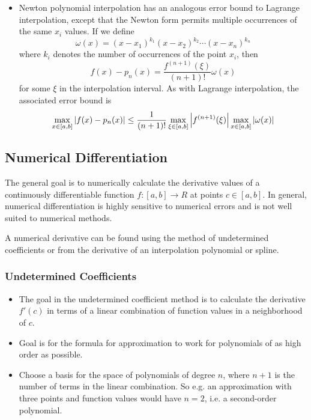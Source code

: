 \documentclass[11pt, a4paper]{article}
\begin{document}
\begin{itemize}
	\item Newton polynomial interpolation has an analogous error bound to Lagrange interpolation, except that the Newton form permits multiple occurrences of the same $ x_{i} $ values. If we define
	\begin{equation*}
		 \omega(x) = (x-x_{1})^{k_{1}}(x-x_{2})^{k_{2}}\cdots(x-x_{n})^{k_{n}}
	\end{equation*}
	where $ k_{i} $ denotes the number of occurrences of the point $ x_{i} $, then
	\begin{equation*}
		f(x) - p_{n}(x) = \frac{f^{(n+1)}(\xi)}{(n+1)!}\omega(x)
	\end{equation*}
	for some $ \xi $ in the interpolation interval. As with Lagrange interpolation, the associated error bound is
	\begin{equation*}
	 	\max_{x\in [a,b]} \abs{f(x) - p_{n}(x)} \leq \frac{1}{(n+1)!} \max_{\xi \in [a,b]} \abs{f^{(n+1)}(\xi)} \max_{x \in [a,b]} \abs{\omega(x)}
	\end{equation*}
	
\end{itemize}



\subsection{Numerical Differentiation}
The general goal is to numerically calculate the derivative values of a continuously differentiable function $ f: [a, b] \to R $ at points $ c \in [a, b] $. In general, numerical differentiation is highly sensitive to numerical errors and is not well suited to numerical methods. 

A numerical derivative can be found using the method of undetermined coefficients or from the derivative of an interpolation polynomial or spline.

\subsubsection{Undetermined Coefficients}
\begin{itemize}
	\item The goal in the undetermined coefficient method is to calculate the derivative $ f'(c) $ in terms of a linear combination of function values in a neighborhood of $ c $. 
	
	\item Goal is for the formula for approximation to work for polynomials of as high order as possible. 
	
	\item Choose a basis for the space of polynomials of degree $ n $, where $ n + 1 $ is the number of terms in the linear combination. So e.g. an approximation with three points and function values would have $ n = 2 $, i.e. a second-order polynomial.
\end{itemize}
\end{document}
